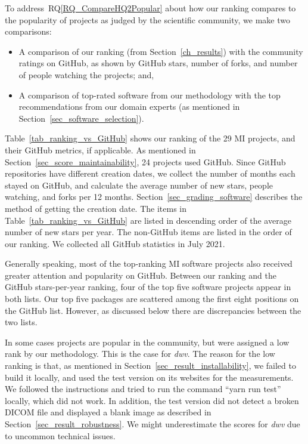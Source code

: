 \documentclass[11pt]{article}
\newcommand{\rqref}[1]{RQ\ref{#1}}
\begin{document}
To address~\rqref{RQ_CompareHQ2Popular} about how our ranking compares to the
popularity of projects as judged by the scientific community, we make two
comparisons:
\begin{itemize}
\item A comparison of our ranking (from Section~\ref{ch_results}) with the
community ratings on GitHub, as shown by GitHub stars, number of forks, and
number of people watching the projects; and,
\item A comparison of top-rated software from our methodology with the top
recommendations from our domain experts (as mentioned in
Section~\ref{sec_software_selection}).
\end{itemize}

Table~\ref{tab_ranking_vs_GitHub} shows our ranking of the 29 MI projects, and
their GitHub metrics, if applicable. As mentioned in
Section~\ref{sec_score_maintainability}, 24 projects used GitHub. Since GitHub
repositories have different creation dates, we collect the number of months each
stayed on GitHub, and calculate the average number of new stars, people
watching, and forks per 12 months. Section~\ref{sec_grading_software} describes
the method of getting the creation date.  The items in
Table~\ref{tab_ranking_vs_GitHub} are listed in descending order of the average
number of new stars per year.  The non-GitHub items are listed in the order of
our ranking.  We collected all GitHub statistics in July 2021.  

Generally speaking, most of the top-ranking MI software projects also received
greater attention and popularity on GitHub. Between our ranking and the GitHub
stars-per-year ranking, four of the top five software projects appear in both
lists. Our top five packages are scattered among the first eight positions on the
GitHub list. However, as discussed below there are discrepancies between the two
lists.

In some cases projects are popular in the community, but were assigned a low
rank by our methodology.  This is the case for \textit{dwv}. The reason for the
low ranking is that, as mentioned in Section~\ref{sec_result_installability}, we
failed to build it locally, and used the test version on its websites for the
measurements. We followed the instructions and tried to run the command ``yarn
run test'' locally, which did not work. In addition, the test version did not
detect a broken DICOM file and displayed a blank image as described in
Section~\ref{sec_result_robustness}. We might underestimate the scores for
\textit{dwv} due to uncommon technical issues. 
\end{document}
